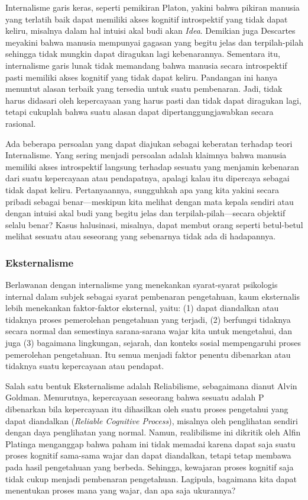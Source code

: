 \documentclass[10pt,a4paper]{article}
\begin{document}
\begin{multicols}{2}
Internalisme garis keras, seperti pemikiran Platon, yakini bahwa pikiran
manusia yang terlatih baik dapat memiliki akses kognitif introspektif
yang tidak dapat keliru, misalnya dalam hal intuisi akal budi akan
\emph{Idea}. Demikian juga Descartes meyakini bahwa manusia mempunyai
gagasan yang begitu jelas dan terpilah-pilah sehingga tidak mungkin
dapat diragukan lagi kebenarannya. Sementara itu, internalisme garis
lunak tidak memandang bahwa manusia secara introspektif pasti memiliki
akses kognitif yang tidak dapat keliru. Pandangan ini hanya menuntut
alasan terbaik yang tersedia untuk suatu pembenaran. Jadi, tidak harus
didasari oleh kepercayaan yang harus pasti dan tidak dapat diragukan
lagi, tetapi cukuplah bahwa suatu alasan dapat dipertanggungjawabkan
secara rasional.

Ada beberapa persoalan yang dapat diajukan sebagai keberatan terhadap
teori Internalisme. Yang sering menjadi persoalan adalah klaimnya bahwa
manusia memiliki akses introspektif langsung terhadap sesuatu yang
menjamin kebenaran dari suatu kepercayaan atau pendapatnya, apalagi
kalau itu dipercaya sebagai tidak dapat keliru. Pertanyaannya,
sungguhkah apa yang kita yakini secara pribadi sebagai benar---meskipun
kita melihat dengan mata kepala sendiri atau dengan intuisi akal budi
yang begitu jelas dan terpilah-pilah---secara objektif selalu benar?
Kasus halusinasi, misalnya, dapat membut orang seperti betul-betul
melihat sesuatu atau seseorang yang sebenarnya tidak ada di hadapannya.

\hypertarget{eksternalisme}{%
\subsubsection{Eksternalisme}\label{eksternalisme}}

Berlawanan dengan internalisme yang menekankan syarat-syarat psikologis
internal dalam subjek sebagai syarat pembenaran pengetahuan, kaum
eksternalis lebih menekankan faktor-faktor eksternal, yaitu: (1) dapat
diandalkan atau tidaknya proses pemerolehan pengetahuan yang terjadi,
(2) berfungsi tidaknya secara normal dan semestinya sarana-sarana wajar
kita untuk mengetahui, dan juga (3) bagaimana lingkungan, sejarah, dan
konteks sosial mempengaruhi proses pemerolehan pengetahuan. Itu semua
menjadi faktor penentu dibenarkan atau tidaknya suatu kepercayaan atau
pendapat.

Salah satu bentuk Eksternalisme adalah Reliabilisme, sebagaimana dianut
Alvin Goldman. Menurutnya, kepercayaan seseorang bahwa sesuatu adalah P
dibenarkan bila kepercayaan itu dihasilkan oleh suatu proses pengetahui
yang dapat diandalkan (\emph{Reliable Cognitive Process}), misalnya oleh
penglihatan sendiri dengan daya penglihatan yang normal. Namun,
realibilisme ini dikritik oleh Alfin Platinga menganggap bahwa paham ini
tidak memadai karena dapat saja suatu proses kognitif sama-sama wajar
dan dapat diandalkan, tetapi tetap membawa pada hasil pengetahuan yang
berbeda. Sehingga, kewajaran proses kognitif saja tidak cukup menjadi
pembenaran pengetahuan. Lagipula, bagaimana kita dapat menentukan proses
mana yang wajar, dan apa saja ukurannya?


\end{multicols}
\end{document}
